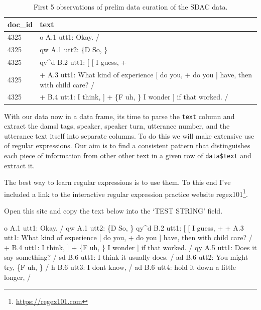 \documentclass[
]{article}
\newenvironment{Shaded}{\begin{snugshade}}{\end{snugshade}}
\newcommand{\NormalTok}[1]{#1}
\DeclareRobustCommand{\href}[2]{#2\footnote{\url{#1}}}
\begin{document}
\begin{table}

\caption{\label{tab:cd-semi-sdac-text-8}First 5 observations of prelim data curation of the SDAC data.}
\centering
\begin{tabular}[t]{ll}
\toprule
doc\_id & text\\
\midrule
4325 & o          A.1 utt1: Okay.  /\\
4325 & qw          A.1 utt2: \{D So, \}\\
4325 & qy\textasciicircum{}d          B.2 utt1: [ [ I guess, +\\
4325 & +          A.3 utt1: What kind of experience [ do you, + do you ] have, then with child care? /\\
4325 & +          B.4 utt1: I think, ] + \{F uh, \} I wonder ] if that worked. /\\
\bottomrule
\end{tabular}
\end{table}

With our data now in a data frame, its time to parse the \texttt{text} column and extract the damsl tags, speaker, speaker turn, utterance number, and the utterance text itself into separate columns. To do this we will make extensive use of regular expressions. Our aim is to find a consistent pattern that distinguishes each piece of information from other other text in a given row of \texttt{data\$text} and extract it.

The best way to learn regular expressions is to use them. To this end I've included a link to the interactive regular expression practice website \href{https://regex101.com}{regex101}.

Open this site and copy the text below into the `TEST STRING' field.

\begin{Shaded}
\begin{Highlighting}[]
\NormalTok{o          A.1 utt1: Okay.  /}
\NormalTok{qw          A.1 utt2: \{D So, \}}
\NormalTok{qy\^{}d          B.2 utt1: [ [ I guess, +}
\NormalTok{+          A.3 utt1: What kind of experience [ do you, + do you ] have, then with child care? /}
\NormalTok{+          B.4 utt1: I think, ] + \{F uh, \} I wonder ] if that worked. /}
\NormalTok{qy          A.5 utt1: Does it say something? /}
\NormalTok{sd          B.6 utt1: I think it usually does.  /}
\NormalTok{ad          B.6 utt2: You might try, \{F uh, \}  /}
\NormalTok{h          B.6 utt3: I don\textquotesingle{}t know,  /}
\NormalTok{ad          B.6 utt4: hold it down a little longer,  /}
\end{Highlighting}
\end{Shaded}
\end{document}
